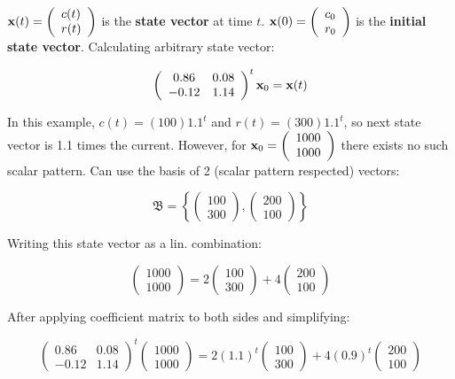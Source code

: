 $\textbf{x}(t)=\left(\begin{array}{l}c(t) \\r(t)\end{array}\right)$
is the \textbf{state vector} at time $t$. $\textbf{x}(0)=\left(\begin{array}{l}c_{0} \\r_{0}\end{array}\right)$
is the \textbf{initial state vector}. Calculating arbitrary state vector:

\[\left(\begin{array}{cc}
    0.86 & 0.08 \\
    -0.12 & 1.14
    \end{array}\right)^{t} \textbf{x}_{0}=\textbf{x}(t)\]

In this example, $c(t)=(100) 1.1^{t}$ and $r(t)=(300) 1.1^{t}$, so next
state vector is 1.1 times the current. However, for $\textbf{x}_{0}=\left(\begin{array}{c}1000 \\1000\end{array}\right)$
there exists no such scalar pattern. Can use the basis of 2 (scalar pattern respected) vectors:

\[\mathfrak{B}=\left\{\left(\begin{array}{l}
    100 \\
    300
    \end{array}\right),\left(\begin{array}{l}
    200 \\
    100
    \end{array}\right)\right\}\]

Writing this state vector as a lin. combination:

\[\left(\begin{array}{l}
    1000 \\
    1000
    \end{array}\right)=2\left(\begin{array}{l}
    100 \\
    300
    \end{array}\right)+4\left(\begin{array}{l}
    200 \\
    100
    \end{array}\right)\]

After applying coefficient matrix to both sides and simplifying:

\[\left(\begin{array}{cc}
    0.86 & 0.08 \\
    -0.12 & 1.14
    \end{array}\right)^{t}\left(\begin{array}{c}
    1000 \\
    1000
    \end{array}\right)=2(1.1)^{t}\left(\begin{array}{c}
    100 \\
    300
    \end{array}\right)+4(0.9)^{t}\left(\begin{array}{c}
    200 \\
    100
    \end{array}\right)\]

